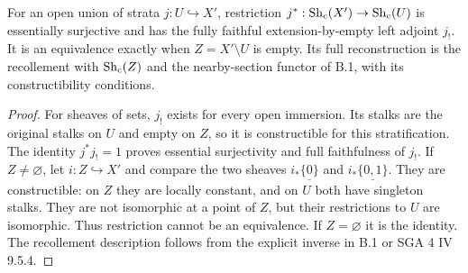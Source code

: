 \begin{result}\label{A3.2}
For an open union of strata $j:U\hookrightarrow X'$, restriction
$j^*: \operatorname{Sh}_{\mathrm{c}}(X')\to\operatorname{Sh}_{\mathrm{c}}(U)$ is essentially
surjective and has the fully faithful extension-by-empty left adjoint
$j_!$. It is an equivalence exactly when $Z=X'\setminus U$ is empty.
Its full reconstruction is the recollement with $\operatorname{Sh}_{\mathrm{c}}(Z)$
and the nearby-section functor of B.1, with its constructibility conditions.
\end{result}
\begin{proof}
For sheaves of sets, $j_!$ exists for every open immersion. Its stalks
are the original stalks on $U$ and empty on $Z$, so it is constructible
for this stratification. The identity $j^*j_!=1$ proves essential
surjectivity and full faithfulness of $j_!$. If $Z\ne\varnothing$,
let $i:Z\hookrightarrow X'$ and compare the two sheaves
$i_*\underline{\{0\}}$ and $i_*\underline{\{0,1\}}$. They are
constructible: on $Z$ they are locally constant, and on $U$ both have
singleton stalks. They are not isomorphic at a point of $Z$, but their
restrictions to $U$ are isomorphic. Thus restriction cannot be an
equivalence. If $Z=\varnothing$ it is the identity. The recollement
description follows from the explicit inverse in B.1 or SGA 4 IV 9.5.4.
\end{proof}

